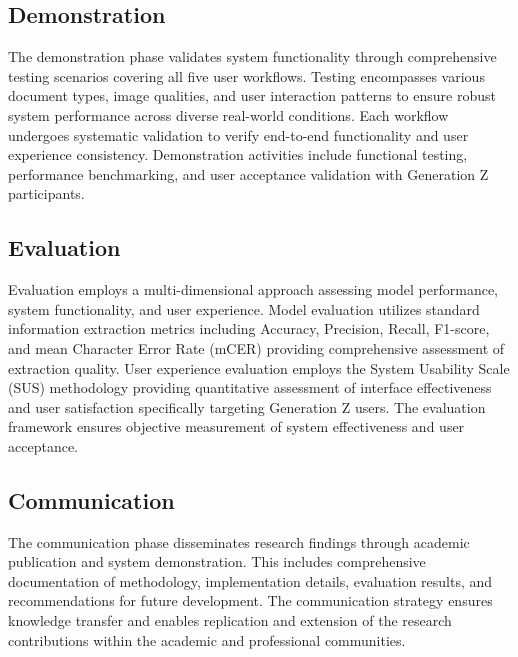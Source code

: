 
\subsection{Demonstration}
The demonstration phase validates system functionality through comprehensive testing scenarios covering all five user workflows. Testing encompasses various document types, image qualities, and user interaction patterns to ensure robust system performance across diverse real-world conditions. Each workflow undergoes systematic validation to verify end-to-end functionality and user experience consistency. Demonstration activities include functional testing, performance benchmarking, and user acceptance validation with Generation Z participants.

\subsection{Evaluation}
Evaluation employs a multi-dimensional approach assessing model performance, system functionality, and user experience. Model evaluation utilizes standard information extraction metrics including Accuracy, Precision, Recall, F1-score, and mean Character Error Rate (mCER) providing comprehensive assessment of extraction quality. User experience evaluation employs the System Usability Scale (SUS) methodology providing quantitative assessment of interface effectiveness and user satisfaction specifically targeting Generation Z users. The evaluation framework ensures objective measurement of system effectiveness and user acceptance.

\subsection{Communication}
The communication phase disseminates research findings through academic publication and system demonstration. This includes comprehensive documentation of methodology, implementation details, evaluation results, and recommendations for future development. The communication strategy ensures knowledge transfer and enables replication and extension of the research contributions within the academic and professional communities.